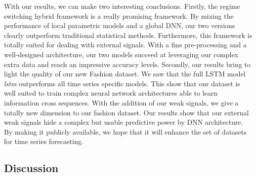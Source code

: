 \documentclass{article} %
\begin{document}


With our results, we can make two interesting conclusions. Firstly, the regime switching hybrid framework is a really promising framework. By mixing the performance of local parametric models and a global DNN, our two versions clearly outperform traditional statistical methods. Furthermore, this framework is totally suited for dealing with external signals. With a fine pre-processing and a well-designed architecture, our two models succeed at leveraging our complex extra data and reach an impressive accuracy levels. Secondly, our results bring to light the quality of our new Fashion dataset. We saw that the full LSTM model \textit{lstm} outperforms all time series specific models. This show that our dataset is well suited to train complex neural network architectures able to learn information cross sequences. With the addition of our weak signals, we give a totally new dimension to our fashion dataset. Our results show that our external weak signals hide a complex but usable predictive power by DNN architecture. By making it publicly available, we hope that it will enhance the set of datasets for time series forecasting. 


\subsection{Discussion}
\end{document}
